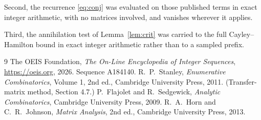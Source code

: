 \documentclass[11pt,a4paper]{article}
\theoremstyle{plain}
\theoremstyle{definition}
\begin{document}
Second, the recurrence \eqref{eq:conj} was evaluated on those published terms in exact
integer arithmetic, with no matrices involved, and vanishes wherever it applies.

Third, the annihilation test of Lemma~\ref{lem:crit} was carried to the full
Cayley--Hamilton bound in exact integer arithmetic rather than to a sampled prefix.

\begin{thebibliography}{9}
 The OEIS Foundation, \emph{The On-Line Encyclopedia of Integer
Sequences}, \url{https://oeis.org}, 2026. Sequence A184140.
 R.~P.~Stanley, \emph{Enumerative Combinatorics}, Volume 1, 2nd ed.,
Cambridge University Press, 2011. (Transfer-matrix method, Section 4.7.)
 P.~Flajolet and R.~Sedgewick, \emph{Analytic Combinatorics}, Cambridge
University Press, 2009.
 R.~A.~Horn and C.~R.~Johnson, \emph{Matrix Analysis}, 2nd ed., Cambridge
University Press, 2013.
\end{thebibliography}
\end{document}
